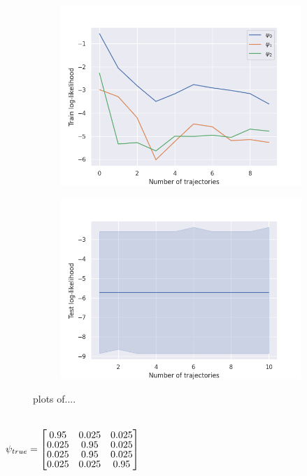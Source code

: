 \begin{figure}[htb]
	\begin{subfigure}{.5\textwidth}
		\centering
		\includegraphics[width=1\linewidth]{figures/llh_[0.98, 0.01, 0.01]}
		\caption{}
		\label{fig:sfig1}
	\end{subfigure}%
	\begin{subfigure}{.5\textwidth}
		\centering
		\includegraphics[width=1\linewidth]{figures/test_likelihood_particleFilter_[0.98, 0.01, 0.01]}
		\caption{}
		\label{fig:sfig2}
	\end{subfigure}
	\caption{plots of....}
	\label{fig:fig}
\end{figure}\\
$\psi_{true} =
\begin{bmatrix} \vspace{-2pt}
0.95 & 0.025 & 0.025 \\  \vspace{-2pt}
0.025 & 0.95 & 0.025 \\  \vspace{-2pt}
0.025 & 0.95 & 0.025 \\  \vspace{-1pt}
0.025 & 0.025 & 0.95
\end{bmatrix}$
